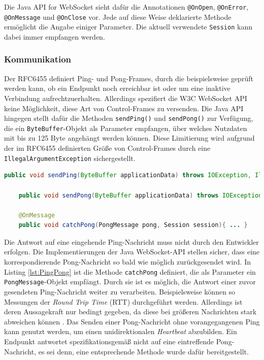 \documentclass[11pt,a4paper,titlepage]{scrartcl}
\numberwithin{equation}{section}
\begin{document}
\noindent Die Java\texttrademark{} API for WebSocket sieht dafür die Annotationen \texttt{@OnOpen}, \texttt{@OnError}, \texttt{@OnMessage} und \texttt{@OnClose} vor. Jede auf diese Weise deklarierte Methode ermöglicht die Angabe einiger Parameter. Die aktuell verwendete \texttt{Session} kann dabei immer empfangen werden. \\

\subsubsection{Kommunikation}
Der RFC6455 definiert Ping- und Pong-Frames, durch die beispielsweise geprüft werden kann, ob ein Endpunkt noch erreichbar ist oder um eine inaktive Verbindung aufrechtzuerhalten. Allerdings spezifiert die W3C WebSocket API keine Möglichkeit, diese Art von Control-Frames zu versenden. Die Java API hingegen stellt dafür die Methoden \texttt{sendPing()} und \texttt{sendPong()} zur Verfügung, die ein \texttt{ByteBuffer}-Objekt als Parameter empfangen, über welches Nutzdaten mit bis zu 125 Byte angehängt werden können. Diese Limitierung wird aufgrund der im RFC6455 definierten Größe von Control-Frames durch eine \texttt{IllegalArgumentException} sichergestellt.\\

\begin{lstlisting}[frame=single, language=Java, caption=Java: Ping/Pong Nachrichten, label=lst:PingPong]
	public void sendPing(ByteBuffer applicationData) throws IOException, IllegalArgumentException

	public void sendPong(ByteBuffer applicationData) throws IOException, IllegalArgumentException

	@OnMessage
	public void catchPong(PongMessage pong, Session session){ ... }
\end{lstlisting}

\noindent Die Antwort auf eine eingehende Ping-Nachricht muss nicht durch den Entwickler erfolgen. Die Implementierungen der Java WebSocket-API stellen sicher, dass eine korrespondierende Pong-Nachricht so bald wie möglich zurückgesendet wird. In Listing \ref{lst:PingPong} ist die Methode \texttt{catchPong} definiert, die als Parameter ein \texttt{PongMessage}-Objekt empfängt. Durch sie ist es möglich, die Antwort einer zuvor gesendeten Ping-Nachricht weiter zu verarbeiten. Beispielsweise können so Messungen der \textit{Round Trip Time} (RTT) durchgeführt werden. Allerdings ist deren Aussagekraft nur bedingt gegeben, da diese bei größeren Nachrichten stark abweichen können \autocite[116]{coward_java_2014}. Das Senden einer Pong-Nachricht ohne vorangegangenen Ping kann genutzt werden, um einen unidirektionalen \textit{Heartbeat} abzubilden. Ein Endpunkt antwortet spezifikationsgemäß nicht auf eine eintreffende Pong-Nachricht, es sei denn, eine entsprechende Methode wurde dafür bereitgestellt. \\
\end{document}

